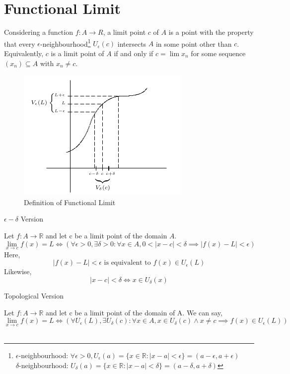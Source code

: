 \documentclass[12pt]{article}
\begin{document}
\section{Functional Limit}
Considering a function $f:A \to R$, a limit point $c$ of $A$ is a point with the property that every $\epsilon$-neighbourhood\footnote{     $\epsilon$-neighbourhood: 
    $ \forall \epsilon > 0, U_\epsilon (a) = \{ x\in\mathbb{R} : |x-a| < \epsilon \} = (a-\epsilon, a+\epsilon)  $ \\
    \quad$\delta$-neighbourhood: $ U_\delta(a) = \{x \in \mathbb{R} : |x-a| < \delta \} = (a-\delta, a+\delta) $
} $U_\epsilon(c)$ intersects $A$ in some point other than $c$. Equivalently, $c$ is a limit point of $A$  if and only if $c=\lim x_n$ for some sequence $(x_n) \subseteq A$ with $x_n \neq c$. \\
\begin{figure}[htpb]
    \centering
    \includegraphics[scale=0.5]{Functional Limit Definition.png}
    \caption{\small Definition of Functional Limit}
\end{figure}

\begin{definition}{$\epsilon-\delta$ Version}

Let $f: A \to \mathbb{R}$ and let c be a limit point of the domain $A$. \[
    \lim_{x \to c} f(x) = L \iff (\forall \epsilon>0, \exists\delta>0 : \forall x \in A, 0 < |x-c| < \delta \implies |f(x)-L| < \epsilon)
\]
Here, \[
    |f(x)-L|<\epsilon \text{ is equivalent to } f(x) \in U_\epsilon(L)
\]
Likewise, \[
    |x-c|<\delta \iff x \in U_\delta(x)
\]
\end{definition}

\begin{definition}{Topological Version}

    Let $f : A \to \mathbb{R}$ and let c be a limit point of the domain of A. We can say, \[
        \lim_{x \to c} f(x)=L \iff ( \forall U_\epsilon(L), \exists U_\delta(c) : \forall x \in A, x \in U_\delta(c) \land x \neq c \implies f(x) \in U_\epsilon(L) )
    \] \\
\end{definition}
\end{document}
